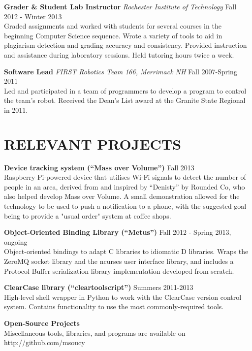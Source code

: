\documentclass[line]{res}
\begin{document}
\begin{resume}
	\textbf{Grader \& Student Lab Instructor}
	\textit{Rochester Institute of Technology}
	\hfill
	Fall 2012 - Winter 2013\\
	Graded assignments and worked with students for several courses in the beginning Computer Science sequence.
	Wrote a variety of tools to aid in plagiarism detection and grading accuracy and consistency.
	Provided instruction and assistance during laboratory sessions.
	Held tutoring hours twice a week.

	\textbf{Software Lead}
	\textit{FIRST Robotics Team 166, Merrimack NH}
	\hfill
	Fall 2007-Spring 2011\\
	Led and participated in a team of programmers to develop a program to control the team's robot.
	Received the Dean's List award at the Granite State Regional in 2011.

\section{RELEVANT PROJECTS}

	\textbf{Device tracking system (``Mass over Volume'')}
	\hfill
	Fall 2013
	\\
	Raspberry Pi-powered device that utilises Wi-Fi signals to detect the number of people in an area, derived from and inspired by ``Denisty'' by Rounded Co, who also helped develop Mass over Volume.
	A small demonstration allowed for the technology to be used to push a notification to a phone, with the suggested goal being to provide a "usual order" system at coffee shops.
	
	\textbf{Object-Oriented Binding Library (``Metus'')}
	\hfill
	Fall 2012 - Spring 2013, ongoing
	\\
	Object-oriented bindings to adapt C libraries to idiomatic D libraries.
	Wraps the ZeroMQ socket library and the ncurses user interface library, and includes a Protocol Buffer serialization library implementation developed from scratch.
	
	\textbf{ClearCase library (``cleartoolscript'')}
	\hfill
	Summers 2011-2013
	\\
	High-level shell wrapper in Python to work with the ClearCase version control system. Contains functionality to use the most commonly-required tools.
	
	\textbf{Open-Source Projects}
	\\
	Miscellaneous tools, libraries, and programs are available on http://github.com/msoucy


\end{resume}
\end{document}
